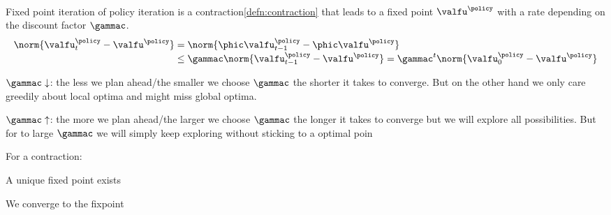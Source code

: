 \begin{corbox}\nospacing
  \begin{cor}\label{cor:policy_iterration_fixed_point_iteration_mdp}\leavevmode\\
    Fixed point iteration of policy iteration is a contraction\cref{defn:contraction} that leads to a fixed point $\valfu^{\policy}$ with a rate depending on the discount factor $\gammac$.
    \begin{align}
      \norm{\valfu_{t}^{\policy}-\valfu^{\policy}}&=\norm{\phic\valfu_{t-1}^{\policy}-\phic\valfu^{\policy}}\nonumber\\[-1\jot]
      &\leq\gammac\norm{\valfu_{t-1}^{\policy}-\valfu^{\policy}}=\gammac^{t}\norm{\valfu_{0}^{\policy}-\valfu^{\policy}}
    \end{align}
  \end{cor}
\end{corbox}
\begin{explanationbox}
  \begin{explanation}\leavevmode
    \begin{itemizenosep}
      \item $\gammac\downarrow$: the less we plan ahead/the smaller we choose $\gammac$ the shorter it takes to converge.
      But on the other hand we only care greedily about local optima and might miss global optima.
      \item $\gammac\uparrow$: the more we plan ahead/the larger we choose $\gammac$ the longer it takes to converge
      but we will explore all possibilities.
      But for to large $\gammac$ we will simply keep exploring without sticking to a optimal poin
    \end{itemizenosep}
  \end{explanation}
\end{explanationbox}
\begin{notebox}\nospacing
  For a contraction:
  \begin{itemizenosep}
    \item A unique fixed point exists
    \item We converge to the fixpoint
  \end{itemizenosep}
\end{notebox}
